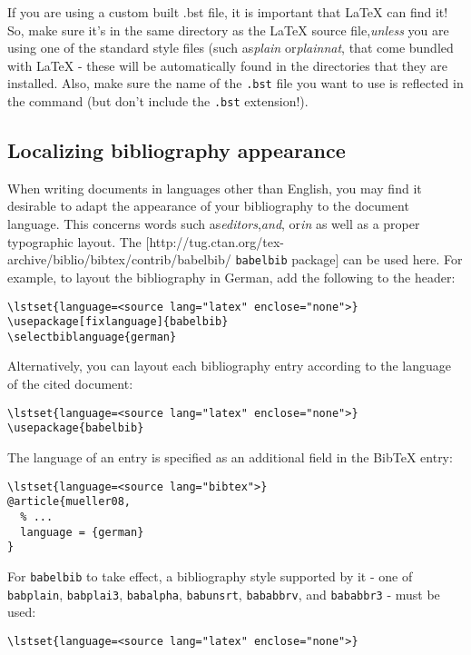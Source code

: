 If you are using a custom built .bst file, it is important that LaTeX can find
it! So, make sure it's in the same directory as the LaTeX source
file,\textit{unless} you are using one of the standard style files (such
as\textit{plain} or\textit{plainnat}, that come bundled with LaTeX - these will
be automatically found in the directories that they are installed. Also, make
sure the name of the \verb|.bst| file you want to use is reflected in
the\verb|| command (but don't include the \verb|.bst|
extension!).

\subsection{Localizing bibliography appearance}
When writing documents in languages other than English, you may find it
desirable to adapt the appearance of your bibliography to the document
language. This concerns words such as\textit{editors},\textit{and},
or\textit{in} as well as a proper typographic layout. The
[http://tug.ctan.org/tex-archive/biblio/bibtex/contrib/babelbib/
\verb|babelbib| package] can be used here. For example, to layout the
bibliography in German, add the following to the header:

\begin{lstlisting}
\lstset{language=<source lang="latex" enclose="none">}
\usepackage[fixlanguage]{babelbib}
\selectbiblanguage{german}
\end{lstlisting}
Alternatively, you can layout each bibliography entry according to the language of the cited document:

\begin{lstlisting}
\lstset{language=<source lang="latex" enclose="none">}
\usepackage{babelbib}
\end{lstlisting}
The language of an entry is specified as an additional field in the BibTeX entry:

\begin{lstlisting}
\lstset{language=<source lang="bibtex">}
@article{mueller08,
  % ...
  language = {german}
}
\end{lstlisting}
For \verb|babelbib| to take effect, a bibliography style supported by it - one of \verb|babplain|, \verb|babplai3|, \verb|babalpha|, \verb|babunsrt|, \verb|bababbrv|, and \verb|bababbr3| - must be used:

\begin{lstlisting}
\lstset{language=<source lang="latex" enclose="none">}


\end{lstlisting}
